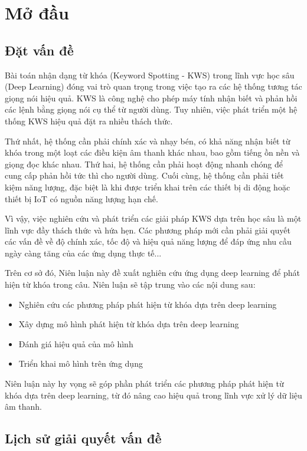 \chapter*{Mở đầu}

\section{Đặt vấn đề}
Bài toán nhận dạng từ khóa (Keyword Spotting - KWS) trong lĩnh vực học sâu (Deep Learning) đóng vai trò quan trọng trong việc tạo ra các hệ thống tương tác giọng nói hiệu quả. KWS là công nghệ cho phép máy tính nhận biết và phản hồi các lệnh bằng giọng nói cụ thể từ người dùng. Tuy nhiên, việc phát triển một hệ thống KWS hiệu quả đặt ra nhiều thách thức.

Thứ nhất, hệ thống cần phải chính xác và nhạy bén, có khả năng nhận biết từ khóa trong một loạt các điều kiện âm thanh khác nhau, bao gồm tiếng ồn nền và giọng đọc khác nhau. Thứ hai, hệ thống cần phải hoạt động nhanh chóng để cung cấp phản hồi tức thì cho người dùng. Cuối cùng, hệ thống cần phải tiết kiệm năng lượng, đặc biệt là khi được triển khai trên các thiết bị di động hoặc thiết bị IoT có nguồn năng lượng hạn chế.

Vì vậy, việc nghiên cứu và phát triển các giải pháp KWS dựa trên học sâu là một lĩnh vực đầy thách thức và hứa hẹn. Các phương pháp mới cần phải giải quyết các vấn đề về độ chính xác, tốc độ và hiệu quả năng lượng để đáp ứng nhu cầu ngày càng tăng của các ứng dụng thực tế...

Trên cơ sở đó, Niên luận này đề xuất nghiên cứu ứng dụng deep learning để phát hiện từ khóa trong câu. Niên luận sẽ tập trung vào các nội dung sau:

\begin{itemize}
    \item Nghiên cứu các phương pháp phát hiện từ khóa dựa trên deep learning
    \item Xây dựng mô hình phát hiện từ khóa dựa trên deep learning
    \item Đánh giá hiệu quả của mô hình
    \item Triển khai mô hình trên ứng dụng
\end{itemize}

Niên luận này hy vọng sẽ góp phần phát triển các phương pháp phát hiện từ khóa dựa trên deep learning, từ đó nâng cao hiệu quả trong lĩnh vực xử lý dữ liệu âm thanh.

\section{Lịch sử giải quyết vấn đề}

